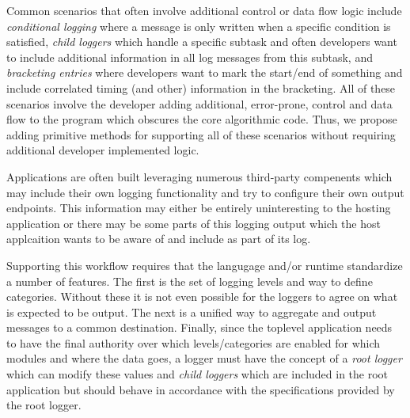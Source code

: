 Common scenarios that often involve additional control or data flow logic 
include \emph{conditional logging} where a message is only written when a 
specific condition is satisfied, \emph{child loggers} which handle a specific 
subtask and often developers want to include additional information in all 
log messages from this subtask, and \emph{bracketing entries} where 
developers want to mark the start/end of something and include correlated 
timing (and other) information in the bracketing. All of these scenarios 
involve the developer adding additional, error-prone, control and data flow 
to the program which obscures the core algorithmic code. Thus, we propose 
adding primitive methods for supporting all of these scenarios without requiring 
additional developer implemented logic.

\begin{design}
Applications are often built leveraging numerous third-party compenents which 
may include their own logging functionality and try to configure their own 
output endpoints. This information may either be entirely uninteresting to the 
hosting application or there may be some parts of this logging output which the 
host applcaition wants to be aware of and include as part of its log.
\end{design}

Supporting this workflow requires that the langugage and/or runtime standardize 
a number of features. The first is the set of logging levels and way to define 
categories. Without these it is not even possible for the loggers to agree on 
what is expected to be output. The next is a unified way to aggregate and output 
messages to a common destination. Finally, since the toplevel application needs 
to have the final authority over which levels/categories are enabled for which 
modules and where the data goes, a logger must have the concept of a 
\emph{root logger} which can modify these values and \emph{child loggers} which 
are included in the root application but should behave in accordance with the 
specifications provided by the root logger.
